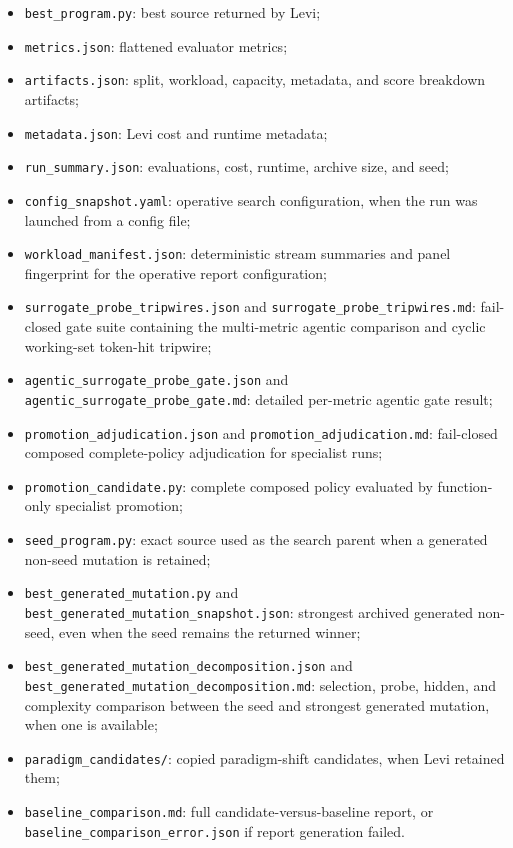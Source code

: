 \documentclass[11pt]{article}
\newcommand{\filepath}[1]{\nolinkurl{#1}}
\begin{document}
\begin{itemize}
  \item \filepath{best_program.py}: best source returned by Levi;
  \item \filepath{metrics.json}: flattened evaluator metrics;
  \item \filepath{artifacts.json}: split, workload, capacity, metadata, and score
  breakdown artifacts;
  \item \filepath{metadata.json}: Levi cost and runtime metadata;
  \item \filepath{run_summary.json}: evaluations, cost, runtime, archive size, and seed;
  \item \filepath{config_snapshot.yaml}: operative search configuration, when the run
  was launched from a config file;
  \item \filepath{workload_manifest.json}: deterministic stream summaries and panel
  fingerprint for the operative report configuration;
  \item \filepath{surrogate_probe_tripwires.json} and
  \filepath{surrogate_probe_tripwires.md}: fail-closed gate suite containing the
  multi-metric agentic comparison and cyclic working-set token-hit tripwire;
  \item \filepath{agentic_surrogate_probe_gate.json} and
  \filepath{agentic_surrogate_probe_gate.md}: detailed per-metric agentic gate result;
  \item \filepath{promotion_adjudication.json} and
  \filepath{promotion_adjudication.md}: fail-closed composed complete-policy
  adjudication for specialist runs;
  \item \filepath{promotion_candidate.py}: complete composed policy evaluated by
  function-only specialist promotion;
  \item \filepath{seed_program.py}: exact source used as the search parent when a
  generated non-seed mutation is retained;
  \item \filepath{best_generated_mutation.py} and
  \filepath{best_generated_mutation_snapshot.json}: strongest archived generated
  non-seed, even when the seed remains the returned winner;
  \item \filepath{best_generated_mutation_decomposition.json} and
  \filepath{best_generated_mutation_decomposition.md}: selection, probe, hidden, and
  complexity comparison between the seed and strongest generated mutation, when one is
  available;
  \item \filepath{paradigm_candidates/}: copied paradigm-shift candidates, when Levi
  retained them;
  \item \filepath{baseline_comparison.md}: full candidate-versus-baseline report, or
  \filepath{baseline_comparison_error.json} if report generation failed.
\end{itemize}
\end{document}

